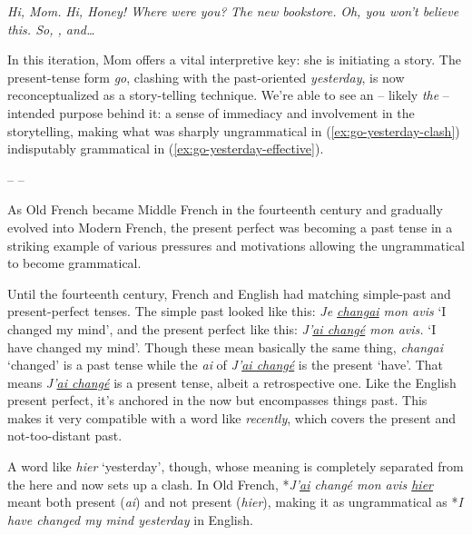 \ea\label{ex:go-yesterday-effective}
    \begin{dialogue}
         \phantom{..*}\textit{Hi, Mom.}
         \phantom{*}\textit{Hi, Honey! Where were you?}
         \phantom{..*}\textit{The new bookstore.}
         \phantom{*}\textit{Oh, you won't believe this. So, , and\dots}
    \end{dialogue}
\z

In this iteration, Mom offers a vital interpretive key: she is initiating a story. The present-tense form \textit{go}, clashing with the past-oriented \textit{yesterday}, is now reconceptualized as a story-telling technique. We're able to see an -- likely \textit{the} -- intended purpose behind it: a sense of immediacy and involvement in the storytelling, making what was sharply ungrammatical in (\ref{ex:go-yesterday-clash}) indisputably grammatical in (\ref{ex:go-yesterday-effective}).

\begin{center}
    -- --
\end{center}

As Old French became Middle French in the fourteenth century and gradually evolved into Modern French, the present perfect was becoming a past tense in a striking example of various pressures and motivations allowing the ungrammatical to become grammatical.

Until the fourteenth century, French and English had matching simple-past and present-perfect tenses. The simple past looked like this: \textit{Je \uline{changai} mon avis} `I changed my mind', and the present perfect like this: \textit{J'\uline{ai changé} mon avis.} `I have changed my mind'. Though these mean basically the same thing, \textit{changai} `changed' is a past tense while the \textit{ai} of \textit{J'\uline{ai changé}} is the present `have'. That means \textit{J'\uline{ai changé}} is a present tense, albeit a retrospective one. Like the English present perfect, it's anchored in the now but encompasses things past. This makes it very compatible with a word like \textit{recently}, which covers the present and not-too-distant past.

A word like \textit{hier} `yesterday', though, whose meaning is completely separated from the here and now sets up a clash. In Old French, *\textit{J'\uline{ai} changé mon avis \uline{hier}} meant both present (\textit{ai}) and not present (\textit{hier}), making it as ungrammatical as *\textit{I have changed my mind yesterday} in English.

